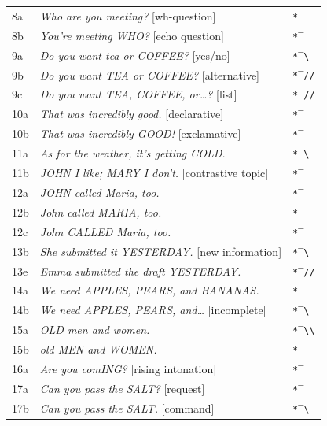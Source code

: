 \begin{longtable}{lll}
8a  & \textit{Who are you meeting?} [wh-question]                & \texttt{*‾} \\
8b  & \textit{You're meeting WHO?} [echo question]               & \texttt{*‾} \\
9a  & \textit{Do you want tea or COFFEE?} [yes/no]               & \texttt{*‾\textbackslash} \\
9b  & \textit{Do you want TEA or COFFEE?} [alternative]          & \texttt{*‾//} \\
9c  & \textit{Do you want TEA, COFFEE, or\ldots?} [list]         & \texttt{*‾//} \\
10a & \textit{That was incredibly good.} [declarative]           & \texttt{*‾} \\
10b & \textit{That was incredibly GOOD!} [exclamative]           & \texttt{*‾} \\
11a & \textit{As for the weather, it's getting COLD.}            & \texttt{*‾\textbackslash} \\
11b & \textit{JOHN I like; MARY I don't.} [contrastive topic]    & \texttt{*‾} \\
12a & \textit{JOHN called Maria, too.}                           & \texttt{*‾} \\
12b & \textit{John called MARIA, too.}                           & \texttt{*‾} \\
12c & \textit{John CALLED Maria, too.}                           & \texttt{*‾} \\
13b & \textit{She submitted it YESTERDAY.} [new information]     & \texttt{*‾\textbackslash} \\
13e & \textit{Emma submitted the draft YESTERDAY.}               & \texttt{*‾//} \\
14a & \textit{We need APPLES, PEARS, and BANANAS.}               & \texttt{*‾} \\
14b & \textit{We need APPLES, PEARS, and\ldots} [incomplete]     & \texttt{*‾\textbackslash} \\
15a & \textit{OLD men and women.}                                & \texttt{*‾\textbackslash\textbackslash} \\
15b & \textit{old MEN and WOMEN.}                                & \texttt{*‾} \\
16a & \textit{Are you comING?} [rising intonation]               & \texttt{*‾} \\
17a & \textit{Can you pass the SALT?} [request]                  & \texttt{*‾} \\
17b & \textit{Can you pass the SALT.} [command]                  & \texttt{*‾\textbackslash} \\

\end{longtable}
